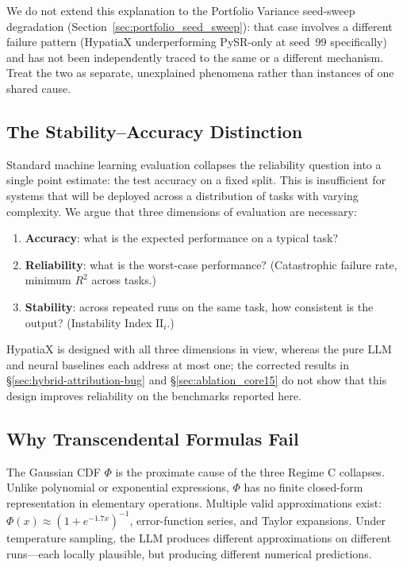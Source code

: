 \documentclass[twoside,11pt]{article}
\newcommand{\Rsq}{R^{2}}
\newcommand{\II}{\mathrm{II}}
\begin{document}
We do not extend this explanation to the Portfolio Variance seed-sweep
degradation (Section~\ref{sec:portfolio_seed_sweep}): that case involves a
different failure pattern (HypatiaX underperforming PySR-only at seed~99
specifically) and has not been independently traced to the same or a
different mechanism. Treat the two as separate, unexplained phenomena
rather than instances of one shared cause.

\subsection{The Stability--Accuracy Distinction}\label{subsec:the-stabilityaccuracy-distinction}
\label{sec:disc_stability}

Standard machine learning evaluation collapses the reliability question into a
single point estimate: the test accuracy on a fixed split.  This is insufficient
for systems that will be deployed across a distribution of tasks with varying
complexity.  We argue that three dimensions of evaluation are necessary:
\begin{enumerate}[leftmargin=2em,label=(\roman*)]
  \item \textbf{Accuracy}: what is the expected performance on a typical task?
  \item \textbf{Reliability}: what is the worst-case performance?
    (Catastrophic failure rate, minimum $\Rsq$ across tasks.)
  \item \textbf{Stability}: across repeated runs on the same task, how consistent
    is the output?  (Instability Index $\II_i$.)
\end{enumerate}

HypatiaX is designed with all three dimensions in view, whereas the pure LLM and neural baselines
each address at most one; the corrected results in \S\ref{sec:hybrid-attribution-bug} and
\S\ref{sec:ablation_core15} do not show that this design improves reliability on the benchmarks reported here.

\subsection{Why Transcendental Formulas Fail}\label{subsec:why-transcendental-formulas-fail}
\label{sec:disc_transcendental}

The Gaussian CDF $\Phi$ is the proximate cause of the three Regime C collapses.
Unlike polynomial or exponential expressions, $\Phi$ has no finite closed-form
representation in elementary operations.  Multiple valid approximations exist:
$\Phi(x) \approx (1 + e^{-1.7x})^{-1}$, error-function series, and Taylor
expansions.  Under temperature sampling, the LLM produces different approximations
on different runs---each locally plausible, but producing different numerical
predictions.
\end{document}
